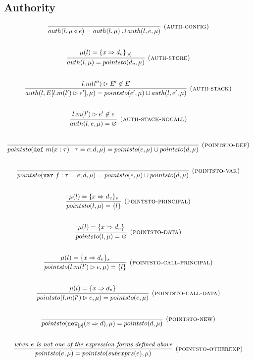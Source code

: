 \documentclass{llncs}
\newcommand{\keywadj}[1]{\mathtt{#1}}
\newcommand{\keyw}[1]{\keywadj{#1}~}
\begin{document}
\newpage

\subsection{Authority}

\[
\begin{array}{c}
\infer[\textsc{(auth-config)}]
  {auth(l,\mu \circ e) = auth(l,\mu) \cup auth(l,e,\mu)}
  {}\\[5ex]

\infer[\textsc{(auth-store)}]
  {auth(l,\mu) = pointsto(d_v,\mu)}
  {\mu(l) = \{ x \Rightarrow d_v \}_{[s]}}\\[5ex]
  
\infer[\textsc{(auth-stack)}]
  {auth(l,E[l.m(l') \rhd e'],\mu) = pointsto(e',\mu) \cup auth(l,e',\mu)}
  {l.m(l'') \rhd E' \not\in E}\\[5ex]
  
\infer[\textsc{(auth-stack-nocall)}]
  {auth(l,e,\mu) = \varnothing}
  {l.m(l') \rhd e' \not\in e}\\[5ex]
  
\infer[\textsc{(pointsto-def)}]
  {pointsto(\keyw{def} m(x:\tau):\tau = e; d,\mu) = pointsto(e,\mu) \cup pointsto(d,\mu)}
  {}\\[5ex]
  
\infer[\textsc{(pointsto-var)}]
  {pointsto(\keyw{var} f:\tau = e; d,\mu) = pointsto(e,\mu) \cup pointsto(d,\mu)}
  {}\\[5ex]
  
\infer[\textsc{(pointsto-principal)}]
  {pointsto(l,\mu) = \{ l \}}
  {\mu(l) = \{ x \Rightarrow d_v \}_s}\\[5ex]
  
\infer[\textsc{(pointsto-data)}]
  {pointsto(l,\mu) = \varnothing }
  {\mu(l) = \{ x \Rightarrow d_v \}}\\[5ex]

\infer[\textsc{(pointsto-call-principal)}]
  {pointsto(l.m(l') \rhd e,\mu) = \{l\} }
  {\mu(l) = \{ x \Rightarrow d_v \}_s}\\[5ex]
  
\infer[\textsc{(pointsto-call-data)}]
  {pointsto(l.m(l') \rhd e,\mu) = pointsto(e,\mu)}
  {\mu(l) = \{ x \Rightarrow d_v \}}\\[5ex]
  
\infer[\textsc{(pointsto-new)}]
  {pointsto(\keywadj{new}_{[p]}(x \Rightarrow d),\mu) = pointsto(d,\mu) }
  {}\\[5ex]
  
\infer[\textsc{(pointsto-otherexp)}]
  {pointsto(e,\mu) = pointsto(subexprs(e),\mu) }
  {\textit{when $e$ is not one of the expression forms defined above}}\\[5ex]

\end{array}
\]
\end{document}
